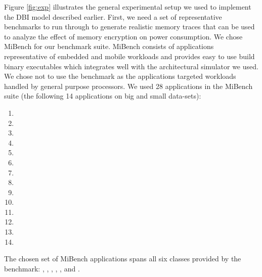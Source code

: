 Figure \ref{fig:exp} illustrates the general experimental setup we used to
implement the DBI model described earlier. First, we need a set of
representative benchmarks to run through to generate realistic memory traces
that can be used to analyze the effect of memory encryption on power
consumption. We chose MiBench \cite{mibench} for our benchmark suite. MiBench
consists of applications representative of embedded and mobile workloads and
provides easy to use build binary executables which integrates well with the
 architectural simulator we used. We chose not to use the 
benchmark as the applications targeted workloads handled by general purpose
processors. We used 28 applications in the MiBench suite (the following 14
applications on big and small data-sets):

\begin{multicols}{2}
  \centering
  \begin{enumerate}
    \item {}
    \item {}
    \item {}
    \item {}
    \item {}
    \item {}
    \item {}
    \item {}
    \item {}
    \item {}
    \item {}
    \item {}
    \item {}
    \item {}
  \end{enumerate}
\end{multicols}

The chosen set of MiBench applications spans all six classes provided by the
benchmark: , , , ,
, and .

